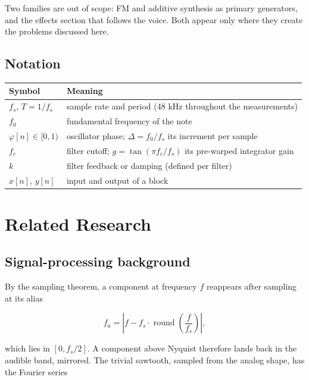 \documentclass[conference]{IEEEtran}
\begin{document}
Two families are out of scope: FM and additive synthesis as primary generators, and the effects section that follows the voice. Both appear only where they create the problems discussed here.

\setcounter{subsection}{3}
\subsection{Notation}
\begin{table}[t]
\centering\footnotesize
\begin{tabularx}{\textwidth}{@{}>{\raggedright\arraybackslash}X>{\raggedright\arraybackslash}X@{}}
\toprule
\textbf{Symbol} & \textbf{Meaning} \\
\midrule
$f_s$, $T = 1/f_s$ & sample rate and period (48 kHz throughout the measurements) \\
$f_0$ & fundamental frequency of the note \\
$\varphi[n] \in [0, 1)$ & oscillator phase; $\Delta = f_0/f_s$ its increment per sample \\
$f_c$ & filter cutoff; $g = \tan(\pi f_c / f_s)$ its pre-warped integrator gain \\
$k$ & filter feedback or damping (defined per filter) \\
$x[n]$, $y[n]$ & input and output of a block \\
\bottomrule
\end{tabularx}
\end{table}

\setcounter{section}{1}
\section{Related Research}
\setcounter{subsection}{0}
\subsection{Signal-processing background}
By the sampling theorem, a component at frequency $f$ reappears after sampling at its alias

\begin{equation*}
f_a = \left| f - f_s \cdot \operatorname{round}\!\left(\frac{f}{f_s}\right) \right|,
\tag{1}
\end{equation*}

which lies in $[0, f_s/2]$. A component above Nyquist therefore lands back in the audible band, mirrored. The trivial sawtooth, sampled from the analog shape, has the Fourier series
\end{document}
